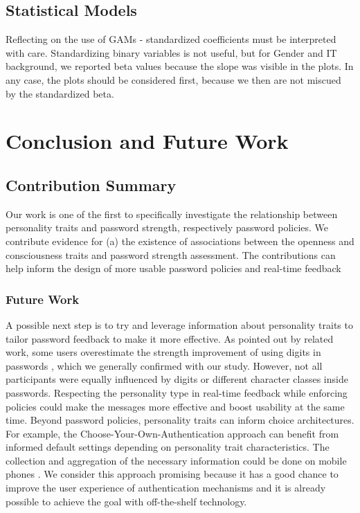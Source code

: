 \subsection{Statistical Models}
Reflecting on the use of GAMs - standardized coefficients must be interpreted with care. Standardizing binary variables is not useful, but for Gender and IT background, we reported beta values because the slope was visible in the plots. In any case, the plots should be considered first, because we then are not miscued by the standardized beta. 

\section{Conclusion and Future Work}



\subsection{Contribution Summary}
Our work is one of the first to specifically investigate the relationship between personality traits and password strength, respectively password policies. We contribute evidence for (a) the existence of associations between the openness and consciousness traits and password strength assessment. 
The contributions can help  inform the design of more usable password policies and real-time feedback

\subsubsection{Future Work}
A possible next step is to try and leverage information about personality traits to tailor password feedback to make it more effective. As pointed out by related work, some users overestimate the strength improvement of using digits in passwords \cite{Ur2016PerceptionsPassword}, which we generally confirmed with our study. However, not all participants were equally influenced by digits or different character classes inside passwords. Respecting the personality type in real-time feedback while enforcing policies could make the messages more effective and boost usability at the same time. Beyond password policies, personality traits can inform choice architectures. For example, the Choose-Your-Own-Authentication approach \cite{Forget2015CYOA} can benefit from informed default settings depending on personality trait characteristics. The collection and aggregation of the necessary information could be done on mobile phones \cite{DeMontjoye2013}. We consider this approach promising because it has a good chance to improve the user experience of authentication mechanisms and it is already possible to achieve the goal with off-the-shelf technology.



